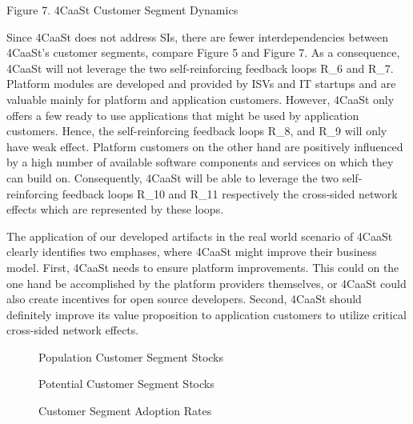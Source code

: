 Figure 7. 4CaaSt Customer Segment Dynamics

Since 4CaaSt does not address SIs, there are fewer interdependencies between 4CaaSt's customer segments, compare Figure 5 and Figure 7. As a consequence, 4CaaSt will not leverage the two self-reinforcing feedback loops R\_6 and R\_7. Platform modules are developed and provided by ISVs and IT startups and are valuable mainly for platform and application customers. However, 4CaaSt only offers a few ready to use applications that might be used by application customers. Hence, the self-reinforcing feedback loops R\_8, and R\_9 will only have weak effect. Platform customers on the other hand are positively influenced by a high number of available software components and services on which they can build on. Consequently, 4CaaSt will be able to leverage the two self-reinforcing feedback loops R\_10 and R\_11 respectively the cross-sided network effects which are represented by these loops. 

The application of our developed artifacts in the real world scenario of 4CaaSt clearly identifies two emphases, where 4CaaSt might improve their business model. First, 4CaaSt needs to ensure platform improvements. This could on the one hand be accomplished by the platform providers themselves, or 4CaaSt could also create incentives for open source developers. Second, 4CaaSt should definitely improve its value proposition to application customers to utilize critical cross-sided network effects.

\newpage

\begin{figure}[htb]
	\centering
	
	\caption{Population Customer Segment Stocks}
\end{figure}

\begin{figure}[htb]
	\centering
	
	\caption{Potential Customer Segment Stocks}
\end{figure}

\begin{figure}[htb]
	\centering
	
	\caption{Customer Segment Adoption Rates}
\end{figure}


